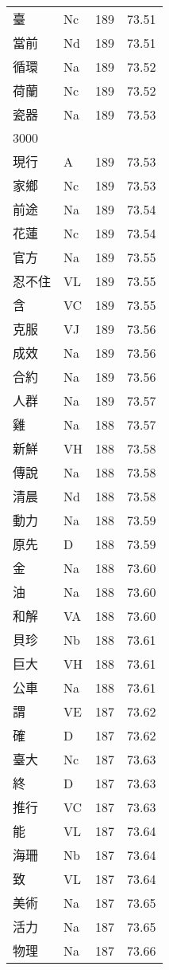 \documentclass[twocolumn]{book}
\begin{document}
\begin{supertabular}{llrr}
臺 & Nc & 189 &  73.51\\
當前 & Nd & 189 &  73.51\\
循環 & Na & 189 &  73.52\\
荷蘭 & Nc & 189 &  73.52\\
瓷器 & Na & 189 &  73.53\\
3000\\
現行 & A & 189 &  73.53\\
家鄉 & Nc & 189 &  73.53\\
前途 & Na & 189 &  73.54\\
花蓮 & Nc & 189 &  73.54\\
官方 & Na & 189 &  73.55\\
忍不住 & VL & 189 &  73.55\\
含 & VC & 189 &  73.55\\
克服 & VJ & 189 &  73.56\\
成效 & Na & 189 &  73.56\\
合約 & Na & 189 &  73.56\\
人群 & Na & 189 &  73.57\\
雞 & Na & 188 &  73.57\\
新鮮 & VH & 188 &  73.58\\
傳說 & Na & 188 &  73.58\\
清晨 & Nd & 188 &  73.58\\
動力 & Na & 188 &  73.59\\
原先 & D & 188 &  73.59\\
金 & Na & 188 &  73.60\\
油 & Na & 188 &  73.60\\
和解 & VA & 188 &  73.60\\
貝珍 & Nb & 188 &  73.61\\
巨大 & VH & 188 &  73.61\\
公車 & Na & 188 &  73.61\\
謂 & VE & 187 &  73.62\\
確 & D & 187 &  73.62\\
臺大 & Nc & 187 &  73.63\\
終 & D & 187 &  73.63\\
推行 & VC & 187 &  73.63\\
能 & VL & 187 &  73.64\\
海珊 & Nb & 187 &  73.64\\
致 & VL & 187 &  73.64\\
美術 & Na & 187 &  73.65\\
活力 & Na & 187 &  73.65\\
物理 & Na & 187 &  73.66\\

\end{supertabular}
\end{document}
